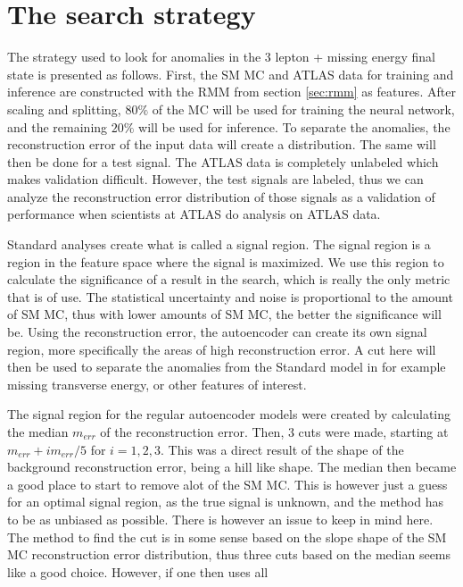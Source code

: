 \section{The search strategy}\label{sec:strategy}
The strategy used to look for anomalies in the 3 lepton + missing energy final state is presented as follows. 
First, the SM MC and ATLAS data for training and inference are constructed with the RMM from section 
\ref{sec:rmm} as features. After scaling and splitting, $80\%$ of the MC will be used for training the neural 
network, and the remaining $20\%$ will be used for inference. To separate the anomalies, the reconstruction 
error of the input data will create a distribution. The same will then be done for a test signal. The ATLAS data 
is completely unlabeled which makes validation difficult. However, the test signals are labeled, thus we can 
analyze the reconstruction error distribution of those signals as a validation of performance when scientists at 
ATLAS do analysis on ATLAS data. \par
Standard analyses create what is called a signal region. The signal region is a region in the feature space where 
the signal is maximized. We use this region to calculate the significance of a result in the search, which is 
really the only metric that is of use. The statistical uncertainty and noise is proportional to the amount of SM MC, 
thus with lower amounts of SM MC, the better the significance will be. Using the reconstruction error, the autoencoder 
can create its own signal region, more specifically the areas of high reconstruction error. A cut here will then be used to 
separate the anomalies from the Standard model in for example missing transverse energy, or other features of interest. \par 
The signal region for the regular autoencoder models were created by calculating the median $m_{err}$ of the 
reconstruction error. Then, 3 cuts were made, starting at $m_{err} + im_{err}/5$ for $i = 1,2,3$. This was a direct 
result of the shape of the background reconstruction error, being a hill like shape. The median then became a 
good place to start to remove alot of the SM MC. This is however just a guess for an optimal signal region, 
as the true signal is unknown, and the method has to be as unbiased as possible. There is however an issue to keep 
in mind here. The method to find the cut is in some sense based on the slope shape of the SM MC reconstruction 
error distribution, thus three cuts based on the median seems like a good choice. However, if one then uses all 
